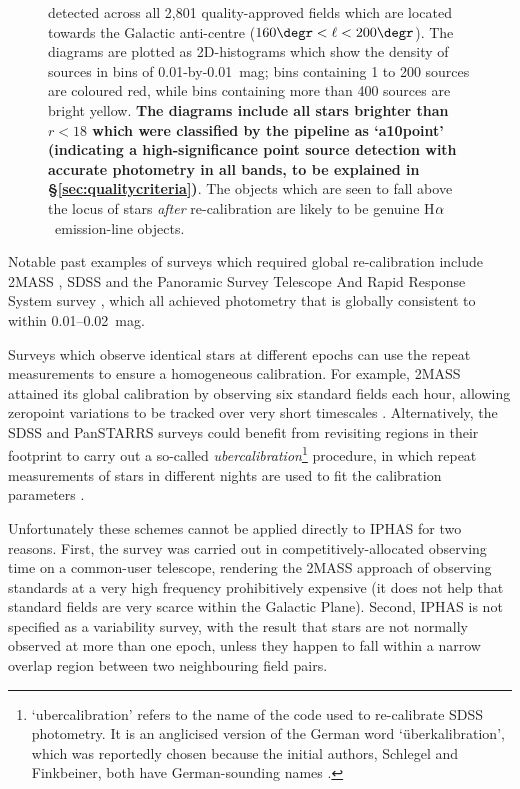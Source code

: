 \documentclass[a4paper,useAMS,usenatbib]{mn2e}
\def\ha{\mbox{H$\rm \alpha$}}
\begin{document}
\begin{figure}
{         detected across all 2,801 quality-approved fields
         which are located towards the Galactic anti-centre
         ($160\degr<\ell<200\degr$).
         The diagrams are plotted as 2D-histograms
         which show the density of sources
         in bins of 0.01-by-0.01~mag;
         bins containing 1 to 200 sources are coloured red,
         while bins containing more than 400 sources are bright yellow.
         {\bf The diagrams include all stars
         brighter than $r<18$ which were
         classified by the pipeline as `a10point'
         (indicating a high-significance point source detection with
         accurate photometry in all bands,
         to be explained in \S\ref{sec:qualitycriteria})}.
         The objects which are seen to fall above the locus of stars
         \emph{after} re-calibration 
         are likely to be genuine \ha\ emission-line objects.}
\end{figure}

Notable past examples of surveys which required
global re-calibration include 
2MASS \citep{Nikolaev2000},
SDSS \citep{Padmanabhan2008}
and the Panoramic Survey Telescope 
And Rapid Response System survey \citep[Pan-STARRS;][]{Schlafly2012},
which all achieved photometry 
that is globally consistent to within 0.01--0.02~mag.

Surveys which observe identical stars at different epochs
can use the repeat measurements to ensure a homogeneous calibration.
For example, 2MASS attained its global calibration
by observing six standard fields each hour, 
allowing zeropoint variations to be tracked 
over very short timescales \citep{Nikolaev2000}.
Alternatively, the SDSS and PanSTARRS surveys could benefit
from revisiting regions in their footprint to 
carry out a so-called \emph{ubercalibration}\footnote{`ubercalibration'
refers to the name of the code used to re-calibrate SDSS photometry. 
It is an anglicised version of the German word `\"uberkalibration',
which was reportedly chosen because the initial authors, Schlegel and Finkbeiner, both
have German-sounding names \citep{Finkbeiner2010}.} procedure,
in which repeat measurements of stars in different nights
are used to fit the calibration parameters
\citep{Ivezic2007,Padmanabhan2008,Schlafly2012}.

Unfortunately these schemes cannot be applied
directly to IPHAS
for two reasons. 
First, the survey was carried out 
in competitively-allocated observing time on a
common-user telescope, 
rendering the 2MASS approach 
of observing standards at a very high frequency
prohibitively expensive (it does not help that 
standard fields 
are very scarce within the Galactic Plane).
Second, IPHAS is not specified as a variability survey, with
the result that stars are not normally observed at more 
than one epoch,
unless they happen to fall within a narrow overlap region 
between two neighbouring field pairs.
\end{document}
